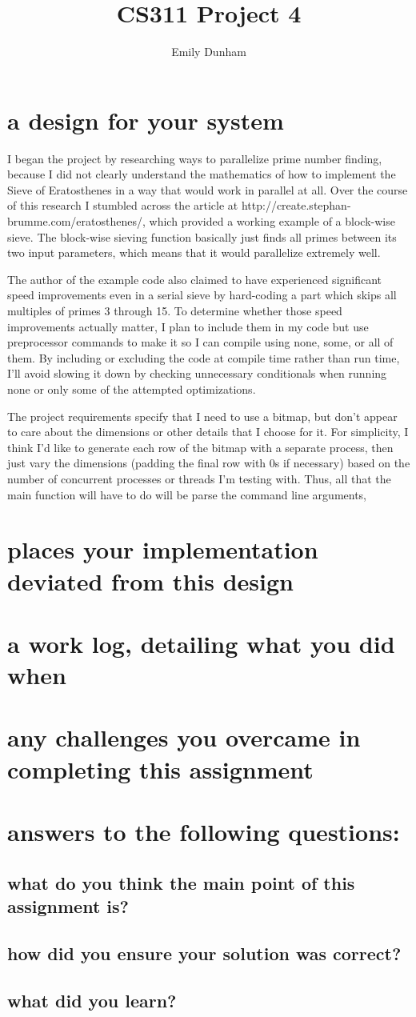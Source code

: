 \documentclass[10pt]{article}
\title{CS311 Project 4}
\author{Emily Dunham}
\date{}
\begin{document}
\maketitle
\section {a design for your system}

I began the project by researching ways to parallelize prime number
finding, because I did not clearly understand the mathematics of how to
implement the Sieve of Eratosthenes in a way that would work in parallel at
all. Over the course of this research I stumbled across the article at
http://create.stephan-brumme.com/eratosthenes/, which provided a working
example of a block-wise sieve. The block-wise sieving function basically just
finds all primes between its two input parameters, which means that it would
parallelize extremely well. 

The author of the example code also claimed to have experienced significant
speed improvements even in a serial sieve by hard-coding a part which skips
all multiples of primes 3 through 15. To determine whether those speed
improvements actually matter, I plan to include them in my code but use
preprocessor commands to make it so I can compile using none, some, or all of
them. By including or excluding the code at compile time rather than run time,
I'll avoid slowing it down by checking unnecessary conditionals when running
none or only some of the attempted optimizations. 

The project requirements specify that I need to use a bitmap, but don't appear
to care about the dimensions or other details that I choose for it. For
simplicity, I think I'd like to generate each row of the bitmap with a
separate process, then just vary the dimensions (padding the final row with 0s
if necessary) based on the number of concurrent processes or threads I'm
testing with. Thus, all that the main function will have to do will be parse
the command line arguments,

\section {places your implementation deviated from this design}
\section{a work log, detailing what you did when}

\section {any challenges you overcame in completing this assignment}
\section{answers to the following questions:}
\subsection{what do you think the main point of this assignment is?}
\subsection{how did you ensure your solution was correct?}
\subsection{what did you learn?}
\end{document}
